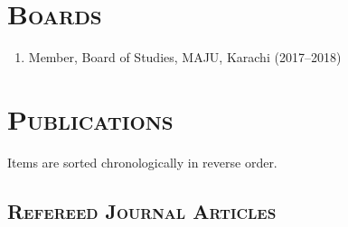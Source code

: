 \documentclass[a4paper, 10pt]{article}
\begin{document}
\section*{\normalfont\textsc{Boards}}
\begin{enumerate}
\itemsep-4pt 
\item Member, Board of Studies, MAJU, Karachi (2017--2018)
\end{enumerate}

\section*{\normalfont\textsc{Publications}}
Items are sorted chronologically in reverse order.
\subsection*{\normalfont\textsc{ Refereed Journal Articles}}
\end{document}
